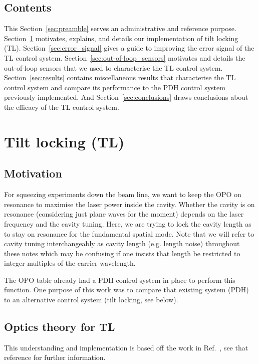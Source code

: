 \documentclass[aps,pra,superscriptaddress,reprint,nofootinbib]{revtex4-1}
\begin{document}
\subsection{Contents}

This Section~\ref{sec:preamble} serves an administrative and reference purpose.
Section~\ref{sec:TL} motivates, explains, and details our implementation of tilt locking (TL).
Section~\ref{sec:error_signal} gives a guide to improving the error signal of the TL control system.
Section~\ref{sec:out-of-loop_sensors} motivates and details the out-of-loop sensors that we used to characterise the TL control system.
Section~\ref{sec:results} contains miscellaneous results that characterise the TL control system and compare its performance to the PDH control system previously implemented.
And Section~\ref{sec:conclusions} draws conclusions about the efficacy of the TL control system.


\section{Tilt locking (TL)}
\label{sec:TL}

\subsection{Motivation}

For squeezing experiments down the beam line, we want to keep the OPO on resonance to maximise the laser power inside the cavity. Whether the cavity is on resonance (considering just plane waves for the moment) depends on the laser frequency and the cavity tuning. Here, we are trying to lock the cavity length as to stay on resonance for the fundamental spatial mode. Note that we will refer to cavity tuning interchangeably as cavity length (e.g. length noise) throughout these notes which may be confusing if one insists that length be restricted to integer multiples of the carrier wavelength.


The OPO table already had a PDH control system in place to perform this function. One purpose of this work was to compare that existing system (PDH) to an alternative control system (tilt locking, see below). 


\subsection{Optics theory for TL}

This understanding and implementation is based off the work in Ref.~\cite{TL:1999}, see that reference for further information.
\end{document}
